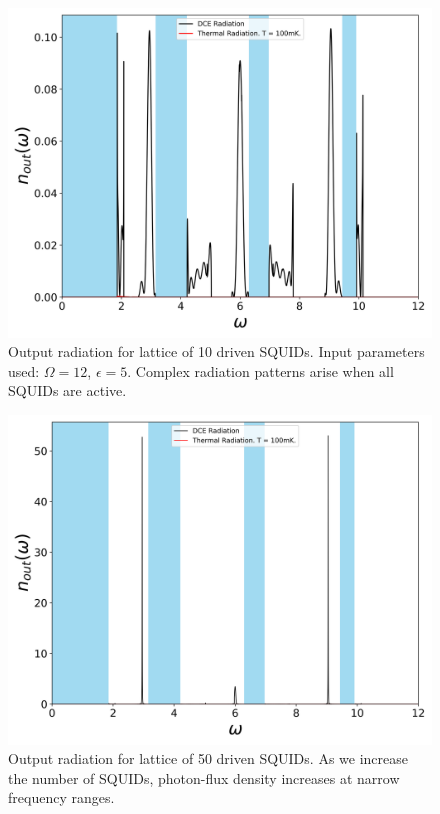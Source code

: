 \begin{figure}[h]
    \centering
    \includegraphics[width=\textwidth, keepaspectratio]{figures/results/10_SQUIDs_active.png}
    \caption{Output radiation for lattice of 10 driven SQUIDs. Input parameters used: $\Omega=12$, $\epsilon=5$. Complex radiation patterns arise when all SQUIDs are active.}
    \label{fig:10_SQUIDs_active}
\end{figure}
%
\begin{figure}[h]
    \centering
    \includegraphics[width=\textwidth, keepaspectratio]{figures/results/50_SQUIDs_active.png}
    \caption{Output radiation for lattice of 50 driven SQUIDs. As we increase the number of SQUIDs, photon-flux density increases at narrow frequency ranges.}
    \label{fig:50_SQUIDs_active}
\end{figure}

